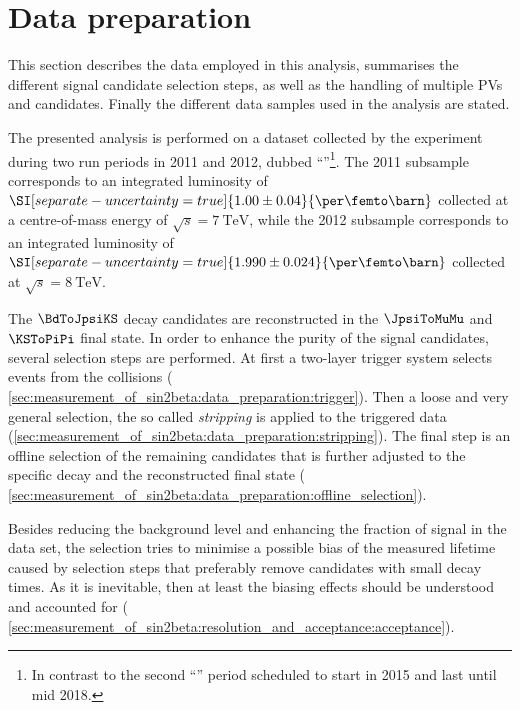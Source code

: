 
\section{Data preparation}
\label{sec:measurement_of_sin2beta:data_preparation}

This section describes the data employed in this analysis, summarises the
different signal candidate selection steps, as well as the handling of multiple
\acp{PV} and \Bmeson candidates. Finally the different data samples used in the
analysis are stated.

The presented analysis is performed on a dataset collected by the \LHCb
experiment during two run periods in 2011 and 2012, dubbed
\enquote{\RunOne{}}\footnote{In contrast to the second \enquote{\RunTwo{}} period
scheduled to start in 2015 and last until mid 2018.}. The 2011 subsample
corresponds to an integrated luminosity of
$\SI[separate-uncertainty=true]{1.00\pm0.04}{\per\femto\barn}$ collected at a
centre-of-mass energy of $\sqrt{s}=\SI{7}{\TeV}$, while the 2012 subsample
corresponds to an integrated luminosity of
$\SI[separate-uncertainty=true]{1.990\pm0.024}{\per\femto\barn}$ collected at
$\sqrt{s}=\SI{8}{\TeV}$.

The $\BdToJpsiKS$ decay candidates are reconstructed in the $\JpsiToMuMu$ and
$\KSToPiPi$ final state. In order to enhance the purity of the signal
candidates, several selection steps are performed. At first a two-layer
trigger system selects events from the \protonproton collisions (\cf
\cref{sec:measurement_of_sin2beta:data_preparation:trigger}). Then a loose and very general
selection, the so called \emph{stripping} is applied to the triggered data
(\cf \cref{sec:measurement_of_sin2beta:data_preparation:stripping}). The final
step is an offline selection of the remaining candidates that is further
adjusted to the specific decay and the reconstructed final state (\cf
\cref{sec:measurement_of_sin2beta:data_preparation:offline_selection}).

Besides reducing the background level and enhancing the fraction of signal in
the data set, the selection tries to minimise a possible bias of the measured
\Bd lifetime caused by selection steps that preferably remove candidates with
small decay times. As it is inevitable, then at least the biasing effects should
be understood and accounted for (\cf
\cref{sec:measurement_of_sin2beta:resolution_and_acceptance:acceptance}).

